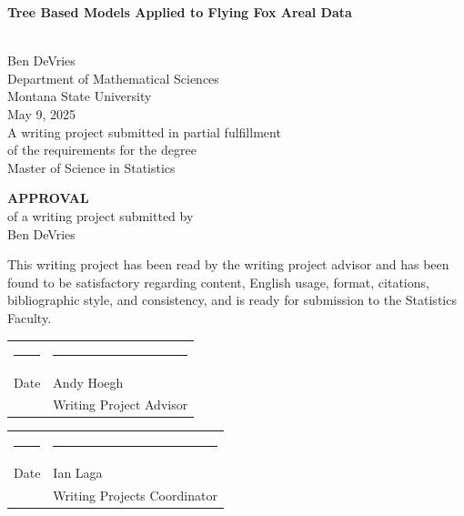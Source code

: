 \documentclass[
  12pt,
  letterpaper,
  DIV=11,
  numbers=noendperiod]{scrartcl}
\author{}
\date{}
\newcommand{\myname}{Ben DeVries}
\newcommand{\myadvisor}{Andy Hoegh}
\newcommand{\wprojcoord}{Ian Laga}  %
\newcommand{\maintitle}{Tree Based Models Applied to Flying Fox Areal Data}
\newcommand{\mydate}{May 9, 2025}
\begin{document}
\begin{singlespace}

\begin{titlepage}
\null
\vspace{2.in}
\begin{center}
{\LARGE\bfseries \maintitle} \vspace{.1in}

\vspace{.05in}
{\LARGE\bfseries $\;$} \\ [.5in]
{\Large  \myname \\
\vspace{0.5cm}
Department of Mathematical Sciences \\
Montana State University \\ [.5in]}
\mydate \\ [1.in]
A writing project submitted in partial fulfillment\\
of the requirements for the degree\\[.25in]
Master of Science in Statistics
\end{center}
\end{titlepage}

\begin{titlepage}
\null
\vspace{2.in}
\begin{center}
{\bfseries\huge APPROVAL}\\[1.in]
of a writing project submitted by\\[.25in]
\myname \\[1.in]
\end{center}
\noindent
This writing project has been read by the writing project advisor and
has been found to be satisfactory regarding content, English usage,
format, citations, bibliographic style, and consistency, and is ready
for submission to the Statistics Faculty.

\vspace{.3in}
\begin{center}
\begin{tabular}{ll}
\rule{2.75in}{.03in} & \rule{2.75in}{.03in} \\
Date& \myadvisor \\
& Writing Project Advisor \\
\end{tabular}
\end{center}

\vspace{1cm}

\begin{center}
\begin{tabular}{ll}
\rule{2.75in}{.03in} & \rule{2.75in}{.03in} \\
Date& \wprojcoord \\
& Writing Projects Coordinator \\
\end{tabular}
\end{center}

\end{titlepage}
\end{singlespace}
\end{document}
